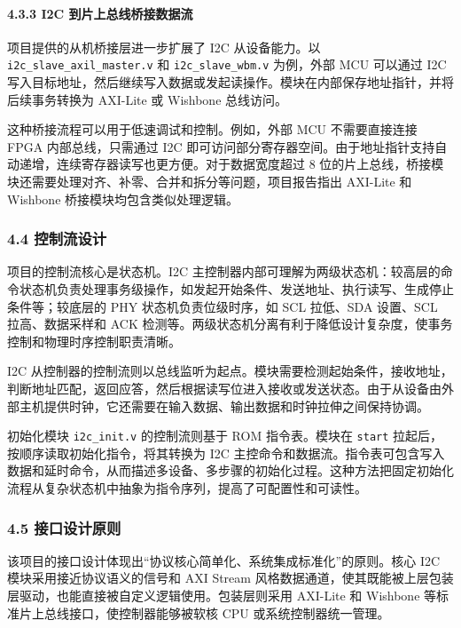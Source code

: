 \paragraph{4.3.3 I2C 到片上总线桥接数据流}\label{i2c-ux5230ux7247ux4e0aux603bux7ebfux6865ux63a5ux6570ux636eux6d41}

项目提供的从机桥接层进一步扩展了 I2C 从设备能力。以 \texttt{i2c\_slave\_axil\_master.v} 和 \texttt{i2c\_slave\_wbm.v} 为例，外部 MCU 可以通过 I2C 写入目标地址，然后继续写入数据或发起读操作。模块在内部保存地址指针，并将后续事务转换为 AXI-Lite 或 Wishbone 总线访问。

这种桥接流程可以用于低速调试和控制。例如，外部 MCU 不需要直接连接 FPGA 内部总线，只需通过 I2C 即可访问部分寄存器空间。由于地址指针支持自动递增，连续寄存器读写也更方便。对于数据宽度超过 8 位的片上总线，桥接模块还需要处理对齐、补零、合并和拆分等问题，项目报告指出 AXI-Lite 和 Wishbone 桥接模块均包含类似处理逻辑。

\subsubsection{4.4 控制流设计}\label{ux63a7ux5236ux6d41ux8bbeux8ba1}

项目的控制流核心是状态机。I2C 主控制器内部可理解为两级状态机：较高层的命令状态机负责处理事务级操作，如发起开始条件、发送地址、执行读写、生成停止条件等；较底层的 PHY 状态机负责位级时序，如 SCL 拉低、SDA 设置、SCL 拉高、数据采样和 ACK 检测等。两级状态机分离有利于降低设计复杂度，使事务控制和物理时序控制职责清晰。

I2C 从控制器的控制流则以总线监听为起点。模块需要检测起始条件，接收地址，判断地址匹配，返回应答，然后根据读写位进入接收或发送状态。由于从设备由外部主机提供时钟，它还需要在输入数据、输出数据和时钟拉伸之间保持协调。

初始化模块 \texttt{i2c\_init.v} 的控制流则基于 ROM 指令表。模块在 \texttt{start} 拉起后，按顺序读取初始化指令，将其转换为 I2C 主控命令和数据流。指令表可包含写入数据和延时命令，从而描述多设备、多步骤的初始化过程。这种方法把固定初始化流程从复杂状态机中抽象为指令序列，提高了可配置性和可读性。

\subsubsection{4.5 接口设计原则}\label{ux63a5ux53e3ux8bbeux8ba1ux539fux5219}

该项目的接口设计体现出``协议核心简单化、系统集成标准化''的原则。核心 I2C 模块采用接近协议语义的信号和 AXI Stream 风格数据通道，使其既能被上层包装层驱动，也能直接被自定义逻辑使用。包装层则采用 AXI-Lite 和 Wishbone 等标准片上总线接口，使控制器能够被软核 CPU 或系统控制器统一管理。

